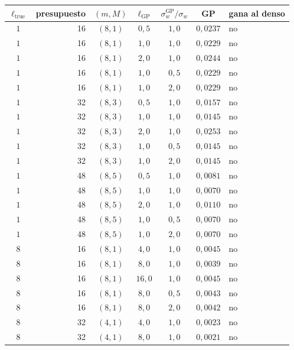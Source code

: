\begin{tabular}{crcccc l}
\toprule
$\ell_{\mathrm{true}}$ & presupuesto & $(m, M)$ & $\ell_{\mathrm{GP}}$ & $\sigma_w^{\mathrm{GP}} / \sigma_w$ & GP & gana al denso \\
\midrule
$1$ & 16 & $(8, 1)$ & $0{,}5$ & $1{,}0$ & $0{,}0237$ & no \\
$1$ & 16 & $(8, 1)$ & $1{,}0$ & $1{,}0$ & $0{,}0229$ & no \\
$1$ & 16 & $(8, 1)$ & $2{,}0$ & $1{,}0$ & $0{,}0244$ & no \\
$1$ & 16 & $(8, 1)$ & $1{,}0$ & $0{,}5$ & $0{,}0229$ & no \\
$1$ & 16 & $(8, 1)$ & $1{,}0$ & $2{,}0$ & $0{,}0229$ & no \\
$1$ & 32 & $(8, 3)$ & $0{,}5$ & $1{,}0$ & $0{,}0157$ & no \\
$1$ & 32 & $(8, 3)$ & $1{,}0$ & $1{,}0$ & $0{,}0145$ & no \\
$1$ & 32 & $(8, 3)$ & $2{,}0$ & $1{,}0$ & $0{,}0253$ & no \\
$1$ & 32 & $(8, 3)$ & $1{,}0$ & $0{,}5$ & $0{,}0145$ & no \\
$1$ & 32 & $(8, 3)$ & $1{,}0$ & $2{,}0$ & $0{,}0145$ & no \\
$1$ & 48 & $(8, 5)$ & $0{,}5$ & $1{,}0$ & $0{,}0081$ & no \\
$1$ & 48 & $(8, 5)$ & $1{,}0$ & $1{,}0$ & $0{,}0070$ & no \\
$1$ & 48 & $(8, 5)$ & $2{,}0$ & $1{,}0$ & $0{,}0110$ & no \\
$1$ & 48 & $(8, 5)$ & $1{,}0$ & $0{,}5$ & $0{,}0070$ & no \\
$1$ & 48 & $(8, 5)$ & $1{,}0$ & $2{,}0$ & $0{,}0070$ & no \\
$8$ & 16 & $(8, 1)$ & $4{,}0$ & $1{,}0$ & $0{,}0045$ & no \\
$8$ & 16 & $(8, 1)$ & $8{,}0$ & $1{,}0$ & $0{,}0039$ & no \\
$8$ & 16 & $(8, 1)$ & $16{,}0$ & $1{,}0$ & $0{,}0045$ & no \\
$8$ & 16 & $(8, 1)$ & $8{,}0$ & $0{,}5$ & $0{,}0043$ & no \\
$8$ & 16 & $(8, 1)$ & $8{,}0$ & $2{,}0$ & $0{,}0042$ & no \\
$8$ & 32 & $(4, 1)$ & $4{,}0$ & $1{,}0$ & $0{,}0023$ & no \\
$8$ & 32 & $(4, 1)$ & $8{,}0$ & $1{,}0$ & $0{,}0021$ & no \\

\end{tabular}
